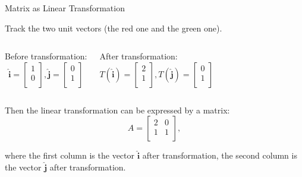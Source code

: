 \documentclass{beamer}
\begin{document}
\begin{frame}{Matrix as Linear Transformation}
\begin{figure}
    \centering
\end{figure}
\vspace{-3pt}
Track the two unit vectors (the red one and the green one).
\vspace{3pt}
\begin{columns}
\hspace{5pt}Before transformation:
\vspace{-3pt}
\begin{equation*}
    \boldsymbol{\hat{i}}=\left[ \begin{array}{c}
	1\\
	0\\
\end{array} \right] ,  \boldsymbol{\hat{j}}=\left[ \begin{array}{c}
	0\\
	1\\
\end{array} \right]
\end{equation*}

\hspace{5pt}After transformation:\
\vspace{-3pt}
\begin{equation*}
    T(\boldsymbol{\hat{i}})=\left[ \begin{array}{c}
	2\\
	1\\
\end{array} \right] ,  T(\boldsymbol{\hat{j}})=\left[ \begin{array}{c}
	0\\
	1\\
\end{array} \right]
\end{equation*}
\end{columns}
\vspace{3pt}
Then the linear transformation can be expressed by a matrix:
    \begin{equation*}
        A= \left[ \begin{matrix}
    	2&		0\\
    	1&		1\\
    \end{matrix} \right] ,
    \end{equation*}

where the first column is the vector $\boldsymbol{\hat{i}}$ after transformation, the second column is the vector $\boldsymbol{\hat{j}}$ after transformation.
\end{frame}
\end{document}
